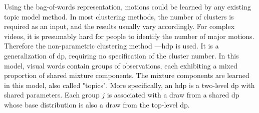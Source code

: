 Using the bag-of-words representation, motions could be learned by any existing topic model method. 
In most clustering methods, the number of clusters is required as an input, and the results usually vary accordingly. For complex videos, it is presumably hard for people to identify the number of major motions. Therefore the non-parametric clustering method ---\gls{hdp} is used. 
It is a generalization of \gls{dp}, requiring no specification of the cluster number. 
In this model, visual words contain groups of observations, each exhibiting a mixed proportion of shared mixture components. 
The mixture components are learned in this model, also called "topics". 
More specifically, an \gls{hdp} is a two-level \gls{dp} with shared parameters. Each group $j$ is associated with a draw from a shared \gls{dp} whose base distribution is also a draw from the top-level \gls{dp}.
